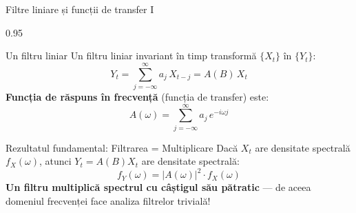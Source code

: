 \documentclass[9pt, aspectratio=169, t]{beamer}
\begin{document}
\begin{frame}{Filtre liniare și funcții de transfer I}
    \begin{cminipage}{0.95\textwidth}
    \vspace{-2mm}
    \begin{block}{Un filtru liniar}
        {\small Un filtru liniar invariant în timp transformă $\{X_t\}$ în $\{Y_t\}$:
        \[
            Y_t = \sum_{j=-\infty}^{\infty} a_j\,X_{t-j} = A(B)\,X_t
        \]
        \textbf{Funcția de răspuns în frecvență} (funcția de transfer) este:
        \[
            A(\omega) = \sum_{j=-\infty}^{\infty} a_j\,e^{-i\omega j}
        \]
        }
    \end{block}
    \vspace{-2mm}
    \begin{alertblock}{Rezultatul fundamental: Filtrarea = Multiplicare}
        {\small Dacă $X_t$ are densitate spectrală $f_X(\omega)$, atunci $Y_t = A(B)X_t$ are densitate spectrală:
        \[
            f_Y(\omega) = |A(\omega)|^2 \cdot f_X(\omega)
        \]
        \textbf{Un filtru multiplică spectrul cu câștigul său pătratic} --- de aceea domeniul frecvenței face analiza filtrelor trivială!}
    \end{alertblock}
    \end{cminipage}
\end{frame}
\end{document}
